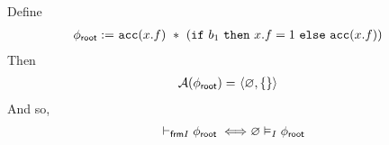 Define
\begin{align*}
{\phi_\textsf{root}} := & \
\texttt{acc}(x.f) \ \ast \
(\texttt{if} \ b_1 \ \texttt{then} \ x.f = 1 \ \texttt{else} \ \texttt{acc}(x.f))
\end{align*}
Then
\begin{align*}
\mathcal{A}({\phi_\textsf{root}}) = & \
\langle \varnothing, \left\{ 
 \right\} \rangle
\end{align*}
And so,
\begin{align*}
\selfframing \phiroot
\iff &
\empty \frames \phiroot \\
& %
\end{align*}

%
